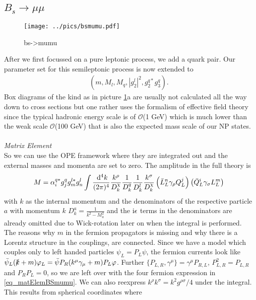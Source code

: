 \subsection{$B_s\rightarrow \mu\mu$}
\begin{figure}[t]
 \texttt{[image: ../pics/bsmumu.pdf]}
 \caption{bs->mumu}
 \label{pic_Bsmumu}
\end{figure}
After we first focussed on a pure leptonic process, we add a quark pair. Our parameter set for this semileptonic process is now extended to
\begin{align}
 \left(m, M_l, M_q, |g_2^l|^2, g_2^{q*} g_3^q\right).
\end{align}
Box diagrams of the kind as in picture \ref{pic_Bsmumu}a are usually not calculated 
all the way down to cross sections but one rather uses the formalism of effective field theory since the typical hadronic energy scale is of
$\mathcal{O}$(1 GeV) which is much lower than the weak scale $\mathcal{O}$(100 GeV) that is also the expected mass scale of our NP states. 
\\ \\ \noindent \textit{Matrix Element}\\
\noindent So we can use 
the OPE framework where they are integrated out and the external masses and momenta are set to zero. The amplitude in the full theory is
\begin{align}
 M =\alpha_i^{q*} g_j^{q} g_m^{l*} g_n^l\int \frac{\; \mathrm{d}^4 k}{(2\pi)^4} \frac{k^\rho}{D^\chi_k}\frac{1}{D^q_k} \frac{1}{D^l_k} \frac{k^\sigma}{D^\chi_k} \left(\bar L_L^n \gamma_\rho Q_L^j\right) \left(\bar Q_L^i \gamma_\sigma L_L^m\right)
 \label{eq_matElemBSmumu}
\end{align}
with $k$ as the internal momentum and the denominators of the respective particle $a$ with momentum $k$ $D^a_k = \frac{1}{k^2-M_a^2}$ and the $\text{i}\epsilon$ terms in the denominators are already omitted
due to Wick-rotation later on when the integral is performed. The reasons why $m$ in the fermion propagators is missing
and why there is a Lorentz structure in the couplings, are connected. Since we have a model which couples only to left handed particles $\psi_L = P_L \psi$,
the fermion currents look like $\bar \psi_L (\slashed{k}+m)\varphi_L = \bar \psi P_R (k^\mu \gamma_\mu+m) P_L\varphi$. Further
$\{P_{L,R},\gamma^\mu\} = \gamma^\mu P_{R,L}$, $P_{L,R}^2 = P_{L,R}$ and $P_R P_L = 0$, so we are left over with the four fermion expression in 
\eqref{eq_matElemBSmumu}. We can also reexpress $k^\rho k^\sigma = k^2 g^{\rho\sigma}/4$ under the integral. This results from spherical coordinates where
